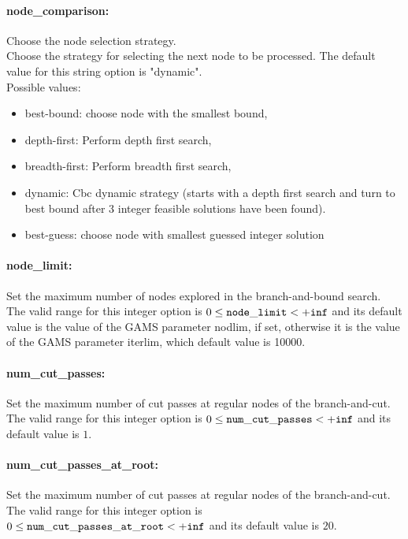\paragraph{node\_comparison:}\label{sec:node_comparison} Choose the node selection strategy. $\;$ \\
 Choose the strategy for selecting the next node
to be processed.
The default value for this string option is "dynamic".
\\ 
Possible values:
\begin{itemize}
   \item best-bound: choose node with the smallest bound,
   \item depth-first: Perform depth first search,
   \item breadth-first: Perform breadth first search,
   \item dynamic: Cbc dynamic strategy (starts with a depth first
search and turn to best bound after 3 integer
feasible solutions have been found).
   \item best-guess: choose node with smallest guessed integer
solution
\end{itemize}

\paragraph{node\_limit:}\label{sec:node_limit} Set the maximum number of nodes explored in the branch-and-bound search. $\;$ \\
 The valid range for this integer option is
$0 \le {\tt node\_limit } <  {\tt +inf}$
and its default value is the value of the GAMS parameter nodlim, if set, otherwise it is the value of the GAMS parameter iterlim, which default value is 10000.


\paragraph{num\_cut\_passes:}\label{sec:num_cut_passes} Set the maximum number of cut passes at regular nodes of the branch-and-cut. $\;$ \\
 The valid range for this integer option is
$0 \le {\tt num\_cut\_passes } <  {\tt +inf}$
and its default value is $1$.


\paragraph{num\_cut\_passes\_at\_root:}\label{sec:num_cut_passes_at_root} Set the maximum number of cut passes at regular nodes of the branch-and-cut. $\;$ \\
 The valid range for this integer option is
$0 \le {\tt num\_cut\_passes\_at\_root } <  {\tt +inf}$
and its default value is $20$.



